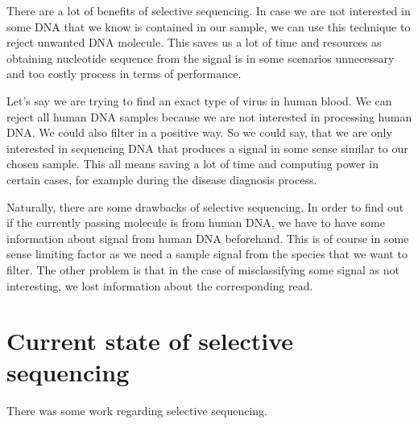 There are a lot of benefits of selective sequencing. In case we are not interested
in some DNA that we know is contained in our sample, we can use this technique to
reject unwanted DNA molecule. This saves us a lot of time and resources as obtaining
nucleotide sequence from the signal is in some scenarios unnecessary and too
costly process in terms of performance.

Let's say we are trying to find an exact type of virus in human blood. We can
reject all human DNA samples because we are not interested in processing human
DNA. We could also filter in a positive way. So we could say, that we are only
interested in sequencing DNA that produces a signal in some sense similar to our
chosen sample. This all means saving a lot of time and computing power in certain
cases, for example during the disease diagnosis process.

Naturally, there are some drawbacks of selective sequencing. In order to find out
if the currently passing molecule is from human DNA, we have to have some information
about signal from human DNA beforehand.
This is of course in some sense limiting factor as we need a sample signal from
the species that we want to filter. The other problem is that in the case of misclassifying
some signal as not interesting, we lost information about the corresponding
read.

\section{Current state of selective sequencing}


There was some work regarding selective sequencing. 
